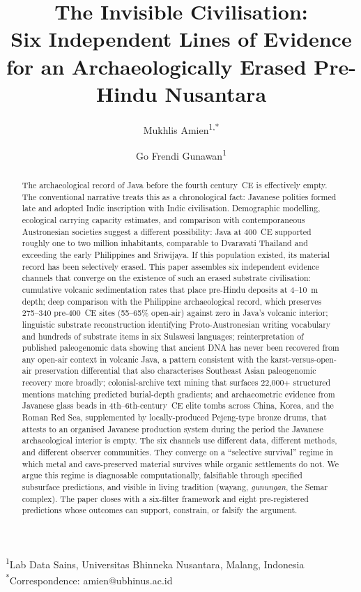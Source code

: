 \documentclass[12pt,a4paper]{article}
\begin{document}
\title{The Invisible Civilisation:\\Six Independent Lines of Evidence for an Archaeologically Erased Pre-Hindu Nusantara}

\author{Mukhlis Amien\textsuperscript{1,*} \and Go Frendi Gunawan\textsuperscript{1}}

\date{}

\maketitle

\noindent\textsuperscript{1}Lab Data Sains, Universitas Bhinneka Nusantara, Malang, Indonesia\\
\textsuperscript{*}Correspondence: amien@ubhinus.ac.id

\begin{abstract}
The archaeological record of Java before the fourth century~CE is effectively empty. The conventional narrative treats this as a chronological fact: Javanese polities formed late and adopted Indic inscription with Indic civilisation. Demographic modelling, ecological carrying capacity estimates, and comparison with contemporaneous Austronesian societies suggest a different possibility: Java at 400~CE supported roughly one to two million inhabitants, comparable to Dvaravati Thailand and exceeding the early Philippines and Sriwijaya. If this population existed, its material record has been selectively erased. This paper assembles six independent evidence channels that converge on the existence of such an erased substrate civilisation: cumulative volcanic sedimentation rates that place pre-Hindu deposits at 4--10~m depth; deep comparison with the Philippine archaeological record, which preserves 275--340 pre-400~CE sites (55--65\% open-air) against zero in Java's volcanic interior; linguistic substrate reconstruction identifying Proto-Austronesian writing vocabulary and hundreds of substrate items in six Sulawesi languages; reinterpretation of published paleogenomic data showing that ancient DNA has never been recovered from any open-air context in volcanic Java, a pattern consistent with the karst-versus-open-air preservation differential that also characterises Southeast Asian paleogenomic recovery more broadly; colonial-archive text mining that surfaces 22{,}000+ structured mentions matching predicted burial-depth gradients; and archaeometric evidence from Javanese glass beads in 4th--6th-century~CE elite tombs across China, Korea, and the Roman Red Sea, supplemented by locally-produced Pejeng-type bronze drums, that attests to an organised Javanese production system during the period the Javanese archaeological interior is empty. The six channels use different data, different methods, and different observer communities. They converge on a ``selective survival'' regime in which metal and cave-preserved material survives while organic settlements do not. We argue this regime is diagnosable computationally, falsifiable through specified subsurface predictions, and visible in living tradition (wayang, \textit{gunungan}, the Semar complex). The paper closes with a six-filter framework and eight pre-registered predictions whose outcomes can support, constrain, or falsify the argument.


\end{abstract}
\end{document}
